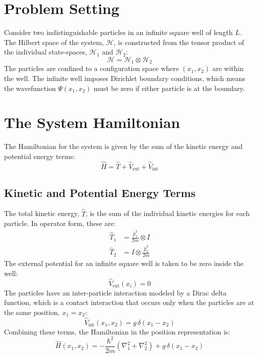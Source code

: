 \section{Problem Setting}

Consider two indistinguishable particles in an infinite square well of length $L$. The Hilbert space of the system, $\mathcal{H}$, is constructed from the tensor product of the individual state-spaces, $\mathcal{H}_1$ and $\mathcal{H}_2$:
\begin{equation}
    \mathcal{H} = \mathcal{H}_1 \otimes \mathcal{H}_2
\end{equation}
The particles are confined to a configuration space where $(x_1, x_2)$ are within the well. The infinite well imposes Dirichlet boundary conditions, which means the wavefunction $\Psi(x_1, x_2)$ must be zero if either particle is at the boundary.

\section{The System Hamiltonian}

The Hamiltonian for the system is given by the sum of the kinetic energy and potential energy terms:
\begin{equation}
    \hat{H} = \hat{T} + \hat{V}_{\text{ext}} + \hat{V}_{\text{int}}
\end{equation}

\subsection{Kinetic and Potential Energy Terms}

The total kinetic energy, $\hat{T}$, is the sum of the individual kinetic energies for each particle. In operator form, these are:
\begin{align}
    \hat{T}_1 &= \frac{\hat{p}_1^2}{2m} \otimes I \\
    \hat{T}_2 &= I \otimes \frac{\hat{p}_2^2}{2m}
\end{align}
The external potential for an infinite square well is taken to be zero inside the well:
\begin{equation}
    \hat{V}_{\text{ext}}(x_i) = 0
\end{equation}
The particles have an inter-particle interaction modeled by a Dirac delta function, which is a contact interaction that occurs only when the particles are at the same position, $x_1 = x_2$:
\begin{equation}
    \hat{V}_{\text{int}}(x_1, x_2) = g\,\delta(x_1 - x_2)
\end{equation}
Combining these terms, the Hamiltonian in the position representation is:
\begin{equation}
    \hat{H}(x_1, x_2) = -\frac{\hbar^2}{2m}(\nabla_1^2 + \nabla_2^2) + g\,\delta(x_1 - x_2)
\end{equation}

